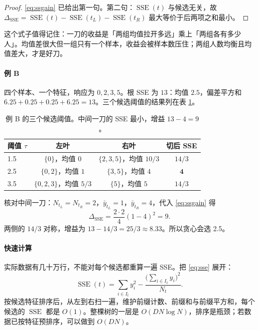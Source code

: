 \documentclass[11pt,a4paper,fontset=windows,zihao=-4]{ctexart}
\DeclareMathOperator{\SSE}{SSE}
\newcommand{\tabhead}{\sffamily\bfseries\color{navy}}
\begin{document}
\begin{proof}
\eqref{eq:ssgain} 已给出第一句。第二句：$\SSE(t)$ 与候选无关，故
$\Delta_{\SSE}=\SSE(t)-\SSE(t_L)-\SSE(t_R)$ 最大等价于后两项之和最小。
\end{proof}

这个式子值得记住：一刀的收益是「两组均值拉开多远」乘上「两组各有多少人」。均值差很大但一组只有一个样本，收益会被样本数压住；两组人数均衡且均值差大，才是好刀。

\paragraph{例 B} 四个样本、一个特征，响应为 $0,2,3,5$。根 SSE 为 $13$：均值 $2.5$，偏差平方和 $6.25+0.25+0.25+6.25=13$。三个候选阈值的结果列在表 \ref{tab:exB}。

\begin{table}[htbp]
\centering
\small
\begin{tabular}{@{}lccc@{}}
\toprule
\rowcolor{navy!7}
\tabhead 阈值 $\tau$ & 左叶 & 右叶 & 切后 SSE\\
\midrule
1.5 & $\{0\}$，均值 $0$ & $\{2,3,5\}$，均值 $10/3$ & $14/3$\\
2.5 & $\{0,2\}$，均值 $1$ & $\{3,5\}$，均值 $4$ & $\mathbf{4}$\\
3.5 & $\{0,2,3\}$，均值 $5/3$ & $\{5\}$，均值 $5$ & $14/3$\\
\bottomrule
\end{tabular}
\caption{例 B 的三个候选阈值。中间一刀的 SSE 最小，增益 $13-4=9$。}
\label{tab:exB}
\end{table}

核对中间一刀：$N_{t_L}=N_{t_R}=2$，$\bar y_{t_L}=1$，$\bar y_{t_R}=4$，代入 \eqref{eq:ssgain} 得
\[
  \Delta_{\SSE}=\frac{2\cdot2}{4}(1-4)^2=9 .
\]
两侧的 $14/3$ 对称，增益为 $13-14/3=25/3\approx8.33$。所以贪心会选 2.5。

\paragraph{快速计算} 实际数据有几十万行，不能对每个候选都重算一遍 SSE。把 \eqref{eq:sse} 展开：
\begin{equation}
  \SSE(t)=\sum_{i\in I_t}y_i^2-\frac{\bigl(\sum_{i\in I_t}y_i\bigr)^2}{N_t}.
  \label{eq:ssfast}
\end{equation}
按候选特征排序后，从左到右扫一遍，维护前缀计数、前缀和与前缀平方和，每个候选的 $\SSE$ 都是 $O(1)$。整棵树的一层是 $O(DN\log N)$，排序是瓶颈；若数据已按特征预排序，可以做到 $O(DN)$。
\end{document}
